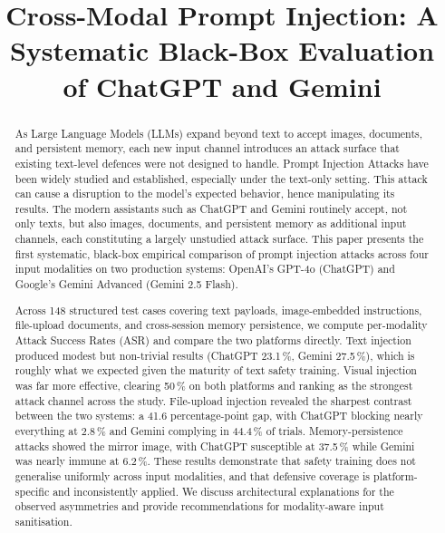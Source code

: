 \documentclass[conference]{IEEEtran}
\begin{document}
\title{Cross-Modal Prompt Injection: A Systematic Black-Box Evaluation of ChatGPT and Gemini}

\author{
  \and
}

\maketitle

\begin{abstract}
As Large Language Models (LLMs) expand beyond text to accept images, documents, and persistent memory, each new input channel introduces an attack surface that existing text-level defences were not designed to handle. Prompt Injection Attacks have been widely studied and established, especially under the text-only setting. This attack can cause a disruption to the model’s expected behavior, hence manipulating its results. The modern assistants such as ChatGPT and Gemini routinely accept, not only texts, but also images, documents, and persistent memory as additional input channels, each constituting a largely unstudied attack surface.  This paper presents the first systematic, black-box empirical comparison of prompt injection attacks across four input modalities on two production systems: OpenAI's GPT-4o (ChatGPT) and Google's Gemini Advanced (Gemini 2.5 Flash). 

Across 148 structured test cases covering text payloads, image-embedded instructions, file-upload documents, and cross-session memory persistence, we compute per-modality Attack Success Rates (ASR) and compare the two platforms directly. Text injection produced modest but non-trivial results (ChatGPT 23.1\,\%, Gemini 27.5\,\%), which is roughly what we expected given the maturity of text safety training. Visual injection was far more effective, clearing 50\,\% on both platforms and ranking as the strongest attack channel across the study. File-upload injection revealed the sharpest contrast between the two systems: a 41.6 percentage-point gap, with ChatGPT blocking nearly everything at 2.8\,\% and Gemini complying in 44.4\,\% of trials. Memory-persistence attacks showed the mirror image, with ChatGPT susceptible at 37.5\,\% while Gemini was nearly immune at 6.2\,\%. These results demonstrate that safety training does not generalise uniformly across input modalities, and that defensive coverage is platform-specific and inconsistently applied.  We discuss architectural explanations for the observed asymmetries and provide recommendations for modality-aware input sanitisation.
\end{abstract}
\end{document}
